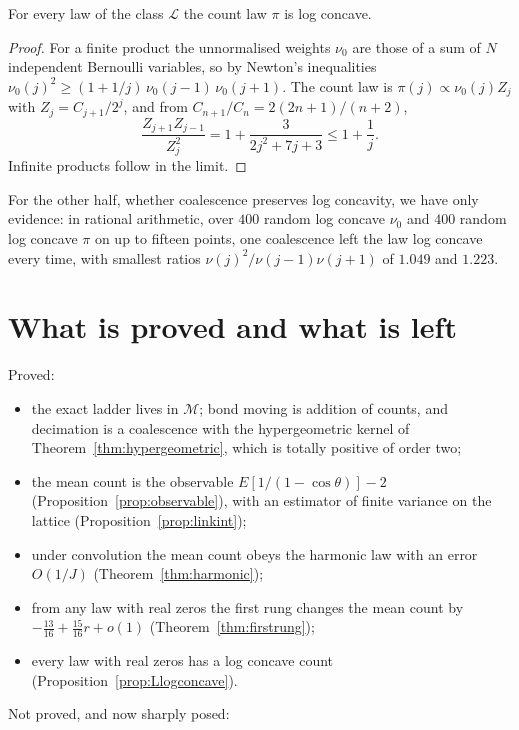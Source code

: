 \begin{proposition}\label{prop:Llogconcave}
For every law of the class $\mathcal L$ the count law $\pi$ is log concave.
\end{proposition}

\begin{proof}
For a finite product the unnormalised weights $\nu_0$ are those of a sum of $N$ independent Bernoulli variables, so by Newton's inequalities $\nu_0(j)^2\ge(1+1/j)\,\nu_0(j-1)\,\nu_0(j+1)$. The count law is $\pi(j)\propto\nu_0(j)Z_j$ with $Z_j=C_{j+1}/2^j$, and from $C_{n+1}/C_n=2(2n+1)/(n+2)$,
\[
\frac{Z_{j+1}Z_{j-1}}{Z_j^2}=1+\frac{3}{2j^2+7j+3}\le1+\frac1j .
\]
Infinite products follow in the limit.
\end{proof}

For the other half, whether coalescence preserves log concavity, we have only evidence: in rational arithmetic, over $400$ random log concave $\nu_0$ and $400$ random log concave $\pi$ on up to fifteen points, one coalescence left the law log concave every time, with smallest ratios $\nu(j)^2/\nu(j-1)\nu(j+1)$ of $1.049$ and $1.223$.

\section{What is proved and what is left}

Proved:
\begin{itemize}
\item the exact ladder lives in $\mathcal M$; bond moving is addition of counts, and decimation is a coalescence with the hypergeometric kernel of Theorem~\ref{thm:hypergeometric}, which is totally positive of order two;
\item the mean count is the observable $E[1/(1-\cos\theta)]-2$ (Proposition~\ref{prop:observable}), with an estimator of finite variance on the lattice (Proposition~\ref{prop:linkint});
\item under convolution the mean count obeys the harmonic law with an error $O(1/J)$ (Theorem~\ref{thm:harmonic});
\item from any law with real zeros the first rung changes the mean count by $-\frac{13}{16}+\frac{15}{16}r+o(1)$ (Theorem~\ref{thm:firstrung});
\item every law with real zeros has a log concave count (Proposition~\ref{prop:Llogconcave}).
\end{itemize}

Not proved, and now sharply posed:

